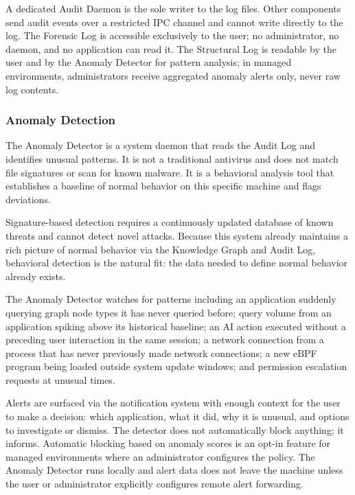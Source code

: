 A dedicated Audit Daemon is the sole writer to the log files. Other components
send audit events over a restricted IPC channel and cannot write directly to
the log. The Forensic Log is accessible exclusively to the user; no
administrator, no daemon, and no application can read it. The Structural Log
is readable by the user and by the Anomaly Detector for pattern analysis;
in managed environments, administrators receive aggregated anomaly alerts only,
never raw log contents.

\subsubsection{Anomaly Detection}
\label{sec:anomaly}

The Anomaly Detector is a system daemon that reads the Audit Log and
identifies unusual patterns. It is not a traditional antivirus and does not
match file signatures or scan for known malware. It is a behavioral analysis
tool that establishes a baseline of normal behavior on this specific machine
and flags deviations.

Signature-based detection requires a continuously updated database of known
threats and cannot detect novel attacks. Because this system already maintains
a rich picture of normal behavior via the Knowledge Graph and Audit Log,
behavioral detection is the natural fit: the data needed to define normal
behavior already exists.

The Anomaly Detector watches for patterns including an application suddenly
querying graph node types it has never queried before; query volume from an
application spiking above its historical baseline; an AI action executed
without a preceding user interaction in the same session; a network connection
from a process that has never previously made network connections; a new eBPF
program being loaded outside system update windows; and permission escalation
requests at unusual times.

Alerts are surfaced via the notification system with enough context for the
user to make a decision: which application, what it did, why it is unusual,
and options to investigate or dismiss. The detector does not automatically
block anything; it informs. Automatic blocking based on anomaly scores is an
opt-in feature for managed environments where an administrator configures the
policy. The Anomaly Detector runs locally and alert data does not leave the
machine unless the user or administrator explicitly configures remote alert
forwarding.

